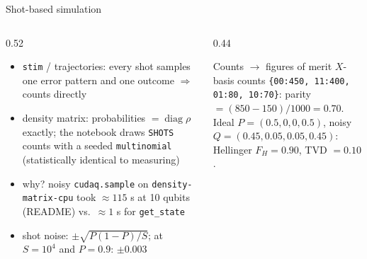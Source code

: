 \documentclass[aspectratio=169,11pt]{beamer}
\begin{document}
\begin{frame}[label=fShots]{Shot-based simulation}
  \begin{columns}[T]
    \begin{column}{0.52\textwidth}
      \small
      \begin{itemize}\itemsep2pt
        \item \texttt{stim} / trajectories: every shot samples one error pattern and one outcome $\Rightarrow$ counts directly
        \item density matrix: probabilities $= \operatorname{diag}\rho$ exactly; the notebook draws \texttt{SHOTS} counts with a seeded
          \texttt{multinomial} (statistically identical to measuring)
        \item why? noisy \texttt{cudaq.sample} on \texttt{density-matrix-cpu} took $\approx 115$ s at 10 qubits (README) vs.\ $\approx1$ s for \texttt{get\_state}
        \item shot noise: $\pm\sqrt{P(1-P)/S}$; at $S = 10^4$ and $P = 0.9$: $\pm0.003$
      \end{itemize}
    \end{column}
    \begin{column}{0.44\textwidth}
      \begin{exampleblock}{Counts $\to$ figures of merit}
        \scriptsize $X$-basis counts \texttt{\{00:450, 11:400, 01:80, 10:70\}}: parity $= (850 - 150)/1000 = 0.70$.\\[2pt]
        Ideal $P = (0.5, 0, 0, 0.5)$, noisy $Q = (0.45, 0.05, 0.05, 0.45)$: Hellinger $F_H = 0.90$, TVD $= 0.10$.
      \end{exampleblock}
    \end{column}
  \end{columns}
\end{frame}
\end{document}
